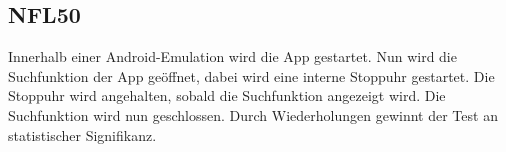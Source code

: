 \subsection*{NFL50}

Innerhalb einer Android-Emulation wird die App gestartet.
Nun wird die Suchfunktion der App geöffnet, dabei wird eine interne Stoppuhr gestartet.
Die Stoppuhr wird angehalten, sobald die Suchfunktion angezeigt wird.
Die Suchfunktion wird nun geschlossen.
Durch Wiederholungen gewinnt der Test an statistischer Signifikanz.